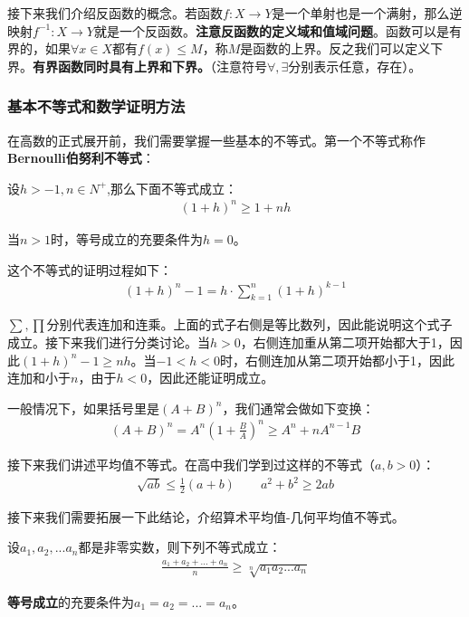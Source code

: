 \documentclass{ctexart}
\let\oldtextbf\textbf %
\renewcommand{\textbf}[1]{\textcolor{btex}{\oldtextbf{#1}}} %
\begin{document}
接下来我们介绍反函数的概念。若函数$f: X\to Y$是一个单射也是一个满射，那么逆映射$f^{-1}: X\to Y$就是一个反函数。\textbf{\color{btex}注意反函数的定义域和值域问题}。函数可以是有界的，如果$\forall x\in X$都有$f(x)\leq M$，称$M$是函数的上界。反之我们可以定义下界。\textbf{\color{btex}有界函数同时具有上界和下界。}（注意符号$\forall,\exists$分别表示任意，存在）。

\subsubsection{基本不等式和数学证明方法}
在高数的正式展开前，我们需要掌握一些基本的不等式。第一个不等式称作\textbf{\color{btex}Bernoulli伯努利不等式}：
\begin{tcolorbox}[
    colback=bac1,     %
    colframe=fra1,   %
    coltitle=white,             %
    coltext=tex1,
    title=Bernoulli不等式,
    fonttitle=\bfseries,        %
arc=3mm,                     %
breakable
]
设$h>-1,n\in N^+$,那么下面不等式成立：
\begin{align*}
    (1+h)^n\geq 1+nh\tag{1-1}
\end{align*}

当$n>1$时，等号成立的充要条件为$h=0$。
\end{tcolorbox}

这个不等式的证明过程如下：
\begin{align*}
    (1+h)^n-1=h\cdot \sum_{k=1}^n (1+h)^{k-1}
\end{align*}

$\sum,\prod$分别代表连加和连乘。上面的式子右侧是等比数列，因此能说明这个式子成立。接下来我们进行分类讨论。当$h>0$，右侧连加重从第二项开始都大于1，因此$(1+h)^n-1\geq nh$。当$-1<h<0$时，右侧连加从第二项开始都小于1，因此连加和小于$n$，由于$h<0$，因此还能证明成立。

一般情况下，如果括号里是$(A+B)^n$，我们通常会做如下变换：
\begin{align*}
    (A+B)^n=A^n(1+\frac{B}{A})^n\geq A^n+nA^{n-1}B\tag{1-2}
\end{align*}

接下来我们讲述平均值不等式。在高中我们学到过这样的不等式（$a,b>0$）：
\begin{align*}
    \sqrt{ab}\leq \frac{1}{2}(a+b)\qquad a^2+b^2\geq 2ab
\end{align*}

接下来我们需要拓展一下此结论，介绍算术平均值-几何平均值不等式。
\begin{tcolorbox}[
    colback=bac1,     %
    colframe=fra1,   %
    coltitle=white,             %
    coltext=tex1,
    title=算术平均值——几何平均值不等式,
    fonttitle=\bfseries,        %
arc=3mm,                     %
breakable
]
设$a_1,a_2,...a_n$都是非零实数，则下列不等式成立：
\begin{align*}
    \frac{a_1+a_2+...+a_n}{n}\geq \sqrt[n]{a_1a_2...a_n}\tag{1-3}
\end{align*}

\textbf{等号成立}的充要条件为$a_1=a_2=...=a_n$。
\end{tcolorbox}
\end{document}
